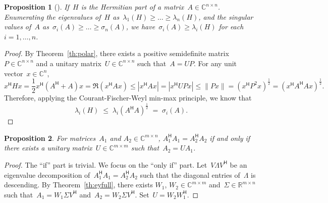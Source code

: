 \documentclass[11pt,a4paper]{article}
\newtheorem{proposition}{Proposition}%
\theoremstyle{definition}
\def\real{\mathbb{R}}
\def\CC{\mathbb{C}}
\newcommand{\hmt}{{\scriptscriptstyle{{\mathsf{H}}}}}
\begin{document}
\begin{proposition}[\cite{Fan_Hoffman_1955}]
  If~$H$ is the Hermitian part of a matrix~$A \in \CC^{n\times n}$. Enumerating the eigenvalues
  of~$H$ as~$\lambda_1(H) \ge\dots\ge \lambda_n(H)$, and the singular values of~$A$
  as~$\sigma_i(A) \ge\dots\ge \sigma_n(A)$, we have~$\sigma_{i}(A)\ge
  \lambda_i(H)$ for each~$i = 1, \dots, n$.
\end{proposition}

\begin{proof}
  By Theorem~\ref{th:polar}, there exists a positive semidefinite matrix~$P\in \CC^{n\times n}$ and
  a unitary matrix~$U\in \CC^{n\times n}$ such that~$A = UP$. For any unit vector~$x\in \CC^n$, 
  \begin{equation*}
    x^\hmt H x = \frac{1}{2}x^\hmt (A^\hmt + A)x = \Re(x^\hmt A x) \le |x^\hmt A x|
    = |x^\hmt U P x|\le \|Px\| = (x^\hmt P^2 x)^{\frac{1}{2}} =(x^\hmt A^\hmt A x)^{\frac{1}{2}}.
  \end{equation*}
  Therefore, applying the Courant-Fischer-Weyl min-max principle, we know that
  \begin{equation*}
    \lambda_i(H) \;\le\; \lambda_i(A^\hmt A)^{\frac{1}{2}}\;=\; \sigma_i(A). 
  \end{equation*} 
\end{proof}

\begin{proposition}
  For matrices~$A_1$ and $A_2 \in \CC^{m\times n}$, $A_1^\hmt A_1 = A_2^\hmt A_2$ if and only if there exists a unitary
  matrix~$U \in \CC^{m\times m}$ such that~$A_2 = UA_1$. 
\end{proposition}

\begin{proof}
  The ``if'' part is trivial. We focus on the ``only if'' part.
  Let~$V \Lambda V^\hmt$ be an eigenvalue decomposition of~$A_1^\hmt A_1 = A_2^\hmt A_2$ such that
  the diagonal entries of~$\Lambda$ is descending. By
  Theorem~\ref{th:eyfull}, there exists $W_1$, $W_2\in \CC^{m\times m}$ and~$\Sigma \in \real^{m\times n}$
  such that~$A_1=W_1 \Sigma V^\hmt$ 
  and~$A_2 = W_2 \Sigma V^\hmt$. Set~$U = W_2W_1^\hmt$.
\end{proof}

\small


\end{document}
